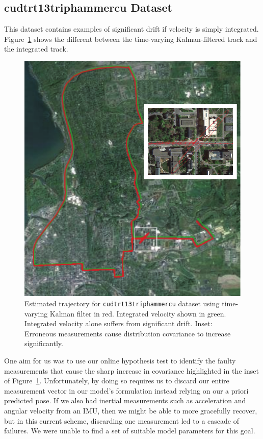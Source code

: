 \subsection{cudtrt13triphammercu Dataset}
This dataset contains examples of significant drift if velocity is simply integrated.  Figure~\ref{fig:track2_map} shows the different between the time-varying Kalman-filtered track and the integrated track.

\begin{figure}
\includegraphics[width=\columnwidth]{track2_map}
\caption{Estimated trajectory for \texttt{cudtrt13triphammercu} dataset using time-varying Kalman filter in red.  Integrated velocity shown in green.  Integrated velocity alone suffers from significant drift.  Inset: Erroneous measurements cause distribution covariance to increase significantly.}
\label{fig:track2_map}
\end{figure}

One aim for us was to use our online hypothesis test to identify the faulty measurements that cause the sharp increase in covariance highlighted in the inset of Figure~\ref{fig:track2_map}.  Unfortunately, by doing so requires us to discard our entire measurement vector in our model's formulation instead relying on our a priori predicted pose.  If we also had inertial measurements such as acceleration and angular velocity from an IMU, then we might be able to more gracefully recover, but in this current scheme, discarding one measurement led to a cascade of failures.  We were unable to find a set of suitable model parameters for this goal.

